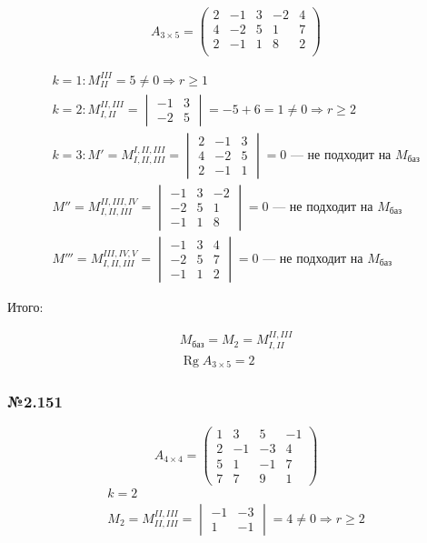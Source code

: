 \documentclass{article}
\DeclareMathOperator*{\Rg}{Rg}
\begin{document}
\[
A_{3 \times 5} = \begin{pmatrix}
	2 & -1 & 3 & -2 & 4 \\
	4 & -2 & 5 & 1 & 7 \\
	2 & -1 & 1 & 8 & 2 \\
\end{pmatrix}
\]

\begin{gather*}
	k = 1: M_{II}^{III} = 5 \ne 0 \Rightarrow r \ge 1 \\
	k = 2: M_{I, II}^{II, III} = \begin{vmatrix}
		-1 & 3 \\
		-2 & 5
	\end{vmatrix} = -5 + 6 = 1 \ne 0 \Rightarrow r \ge 2 \\
	k = 3: M' = M_{I, II, III}^{I, II, III} = \begin{vmatrix}
		2 & -1 & 3 \\
		4 & -2 & 5 \\
		2 & -1 & 1
	\end{vmatrix} = 0 \text{ --- не подходит на $M_\text{баз}$} \\
	M'' = M_{I, II, III}^{II, III, IV} = \begin{vmatrix}
		-1 & 3 & -2 \\
		-2 & 5 & 1 \\
		-1 & 1 & 8
	\end{vmatrix} = 0 \text{ --- не подходит на $M_\text{баз}$} \\
	M''' = M_{I, II, III}^{III, IV, V} = \begin{vmatrix}
		-1 & 3 & 4 \\
		-2 & 5 & 7 \\
		-1 & 1 & 2
	\end{vmatrix} = 0 \text{ --- не подходит на $M_\text{баз}$}
\end{gather*}

Итого:

\begin{gather*}
	M_\text{баз} = M_2 = M_{I, II}^{II, III} \\
	\Rg{A_{3 \times 5}} = 2
\end{gather*}

\subsubsection*{№2.151}

\[
A_{4 \times 4} = \begin{pmatrix}
	1 & 3 & 5 & -1 \\
	2 & -1 & -3 & 4 \\
	5 & 1 & -1 & 7 \\
	7 & 7 & 9 & 1
\end{pmatrix}
\]
\begin{gather*}
	k = 2 \\
	M_2 = M_{II, III}^{II, III} = \begin{vmatrix}
		-1 & -3 \\
		1 & -1
	\end{vmatrix} = 4 \ne 0 \Rightarrow r \ge 2 \\
\end{gather*}
\end{document}
